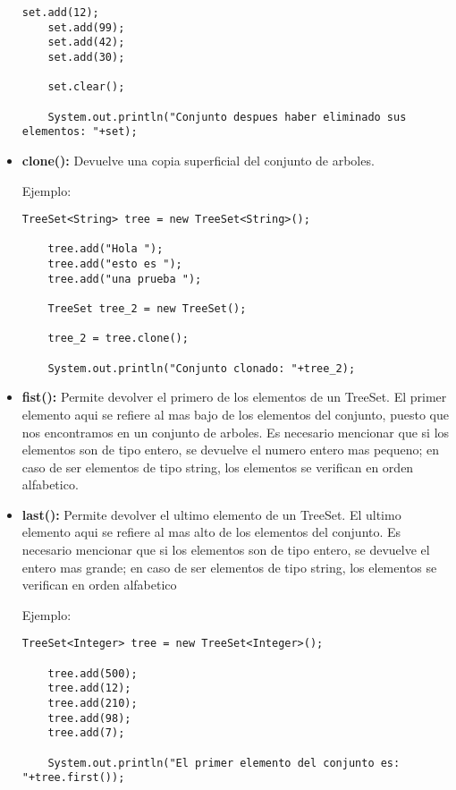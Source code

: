 \documentclass[12pt, letterpaper]{article} %
\begin{document}
\begin{itemize}
\begin{lstlisting}[frame=single]
    set.add(12);
    set.add(99);
    set.add(42);
    set.add(30);

    set.clear();

    System.out.println("Conjunto despues haber eliminado sus elementos: "+set);
    \end{lstlisting}

    \item \textbf{clone():} Devuelve una copia superficial del conjunto de arboles.

    Ejemplo:
    \lstset{language = Java, breaklines=true, basicstyle=\footnotesize}
    \begin{lstlisting}[frame=single]
    TreeSet<String> tree = new TreeSet<String>();

    tree.add("Hola ");
    tree.add("esto es ");
    tree.add("una prueba ");

    TreeSet tree_2 = new TreeSet();

    tree_2 = tree.clone();

    System.out.println("Conjunto clonado: "+tree_2);
    \end{lstlisting}

    \item \textbf{fist():} Permite devolver el primero de los elementos de un TreeSet. El primer elemento aqui se refiere al mas bajo de los elementos del conjunto, puesto que nos encontramos en un conjunto de arboles. Es necesario mencionar que si los elementos son de tipo entero, se devuelve el numero entero mas pequeno; en caso de ser elementos de tipo string, los elementos se verifican en orden alfabetico.

    \item \textbf{last():} Permite devolver el ultimo elemento de un TreeSet. El ultimo elemento aqui se refiere al mas alto de los elementos del conjunto. Es necesario mencionar que si los elementos son de tipo entero, se devuelve el entero mas grande; en caso de ser elementos de tipo string, los elementos se verifican en orden alfabetico

    Ejemplo:
    \lstset{language = Java, breaklines=true, basicstyle=\footnotesize}
    \begin{lstlisting}[frame=single]
    TreeSet<Integer> tree = new TreeSet<Integer>();

    tree.add(500);
    tree.add(12);
    tree.add(210);
    tree.add(98);
    tree.add(7);

    System.out.println("El primer elemento del conjunto es: "+tree.first());


\end{lstlisting}
\end{itemize}
\end{document}

